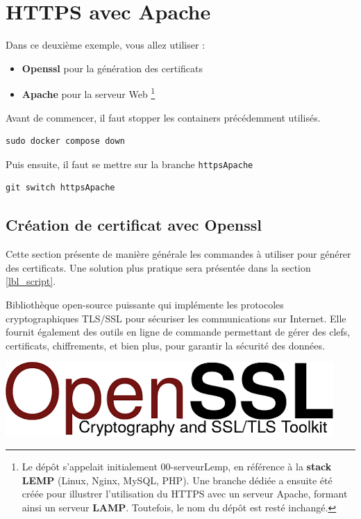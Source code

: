 \documentclass[french, 12pt]{article}%
\newcommand{\itemE}{\item[$\bullet$]}
\newcommand{\titreencadre}{Titre}
\newenvironment{encadre}[1]{\renewcommand{\titreencadre}{#1}
	\begin{mdframed}[style=encadrestyle]
	\vspace{0.5\baselineskip}
	}{%
	\end{mdframed}}
\begin{document}
\section{HTTPS avec Apache}
Dans ce deuxième exemple, vous allez utiliser  :
 \begin{itemize}
 \itemE \textbf{Openssl} pour la génération des certificats
 \itemE \textbf{Apache} pour la serveur Web \footnote{Le dépôt s’appelait initialement 00-serveurLemp, en référence à la \textbf{stack LEMP} (Linux, Nginx, MySQL, PHP). Une branche dédiée a ensuite été créée pour illustrer l’utilisation du HTTPS avec un serveur Apache, formant ainsi un serveur \textbf{LAMP}. Toutefois, le nom du dépôt est resté inchangé.}
 \end{itemize}

Avant de commencer, il faut stopper les containers précédemment utilisés. 
\begin{lstlisting}[style=commande]
sudo docker compose down
\end{lstlisting}

Puis ensuite, il faut se mettre sur la branche \verb?httpsApache ?
\begin{lstlisting}[style=commande]
git switch httpsApache 
\end{lstlisting}

\newpage

\subsection{Création de certificat avec Openssl}
Cette section présente de manière générale les commandes à utiliser pour générer des certificats. Une solution plus pratique sera présentée dans la section \ref{lbl_script}.

\begin{encadre}{OpenSSL}
Bibliothèque open-source puissante qui implémente les protocoles cryptographiques TLS/SSL pour sécuriser les communications sur Internet. Elle fournit également des outils en ligne de commande permettant de gérer des clefs, certificats, chiffrements, et bien plus, pour garantir la sécurité des données.
\end{encadre}

\begin{center}
\includegraphics[scale=0.4]{./ressource/logoOpenSSL}
\end{center}
\end{document}
